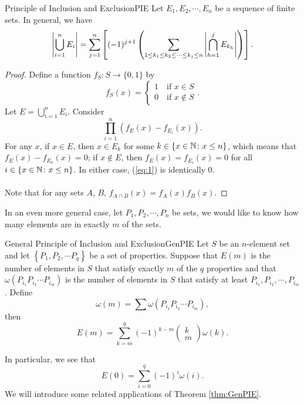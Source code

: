 \documentclass[math]{amznotes}
\theoremstyle{remark}
\begin{document}
\begin{thmbox}{Principle of Inclusion and Exclusion}{PIE}
    Let $E_1, E_2, \cdots, E_n$ be a sequence of finite sets. In general, we have
    \begin{equation*}
        {\left\lvert {\bigcup_{i = 1}^n E_i} \right\rvert} = \sum_{j = 1}^{n} \left[(-1)^{j + 1}\left(\sum_{1 \leq k_1 \leq k_2 \leq \cdots \leq k_j \leq n}{\left\lvert {\bigcap_{h = 1}^{j}E_{k_h}} \right\rvert}\right)\right].
    \end{equation*}
    \tcblower
    \begin{proof}
        Define a function $f_S \colon S \to \{0, 1\}$ by
        \begin{equation*}
            f_S(x) = \begin{cases}
                1 \quad \textrm{if } x \in S \\
                0 \quad \textrm{if } x \notin S
            \end{cases}.
        \end{equation*}
        Let $E = \bigcup_{i = 1}^n E_i$. Consider
        \begin{equation}\label{eq:1}
            \prod_{i = 1}^{n}\left(f_E(x) - f_{E_i}(x)\right). \tag{*}
        \end{equation}
        For any $x$, if $x \in E$, then $x \in E_k$ for some $k \in \left\{x \in \mathbb{N} \colon x \leq n\right\}$, which means that $f_E(x) - f_{E_k}(x) = 0$; if $x \notin E$, then $f_E(x) = f_{E_i}(x) = 0$ for all $i \in \left\{x \in \mathbb{N} \colon x \leq n\right\}$. In either case, (\ref{eq:1}) is identically $0$.
        \\\\
        Note that for any sets $A$, $B$, $f_{A \cap B}(x) = f_A(x)f_B(x)$.
    \end{proof}
\end{thmbox}
In an even more general case, let $P_1, P_2, \cdots, P_n$ be sets, we would like to know how many elements are in exactly $m$ of the sets.
\begin{thmbox}{General Principle of Inclusion and Exclusion}{GenPIE}
    Let $S$ be an $n$-element set and let $\left\{P_1, P_2, \cdots P_q\right\}$ be a set of properties. Suppose that $E(m)$ is the number of elements in $S$ that satisfy exactly $m$ of the $q$ properties and that $\omega\left(P_{i_1}P_{i_2}\cdots P_{i_m}\right)$ is the number of elements in $S$ that satisfy at least $P_{i_1}, P_{i_2},\cdots, P_{i_m}$. Define
    \begin{equation*}
        \omega(m) = \sum \omega\left(P_{i_1}P_{i_2}\cdots P_{i_m}\right),
    \end{equation*}
    then
    \begin{equation*}
        E(m) = \sum_{k = m}^{q}(-1)^{k - m}\begin{pmatrix}
            k \\
            m
        \end{pmatrix}\omega(k).
    \end{equation*}
\end{thmbox}
In particular, we see that 
\begin{equation*}
    E(0) = \sum_{i = 0}^{q}(-1)^i\omega(i).
\end{equation*}
We will introduce some related applications of Theorem \ref{thm:GenPIE}.
\end{document}
